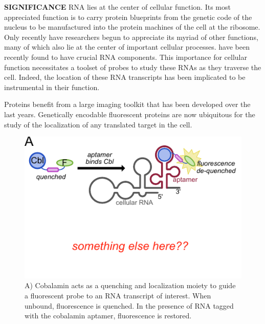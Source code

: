 
\textbf{SIGNIFICANCE}
RNA lies at the center of cellular function. Its most appreciated function is to carry protein blueprints from the genetic code of the nucleus to be manufactured into the protein machines of the cell at the ribosome. Only recently have researchers begun to appreciate its myriad of other functions, many of which also lie at the center of important cellular processes.  have been recently found to have crucial RNA components. This importance for cellular function necessitates a toolset of probes to study these RNAs as they traverse the cell. Indeed, the location of these RNA transcripts has been implicated to be instrumental in their function.\cite{Muller-McNicollHowcellsget2013a}

Proteins benefit from a large imaging toolkit that has been developed over the last  years. Genetically encodable fluorescent proteins are now ubiquitous for the study of the localization of any translated target in the cell. 

\begin{figure}
\begin{centering}
\includegraphics[width=\textwidth]{figures/fig1.pdf}

\end{centering}
\footnotesize
\caption{\label{figure:riboglow}
A) Cobalamin acts as a quenching and localization moiety to guide a fluorescent probe to an RNA transcript of interest. When unbound, fluorescence is quenched. In the presence of RNA tagged with the cobalamin aptamer, fluorescence is restored.
}
\end{figure}

